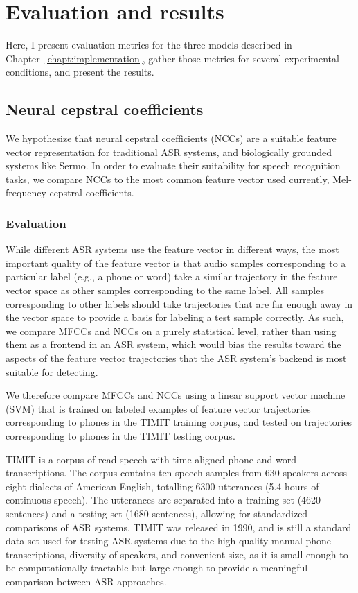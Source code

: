 \chapter{Evaluation and results}
\label{chapt:results}

Here,
I present evaluation metrics for the three models
described in Chapter~\ref{chapt:implementation},
gather those metrics
for several experimental conditions,
and present the results.

\section{Neural cepstral coefficients}

We hypothesize that
neural cepstral coefficients (NCCs)
are a suitable feature vector representation
for traditional ASR systems,
and biologically grounded systems like Sermo.
In order to evaluate
their suitability for speech recognition tasks,
we compare NCCs to the most common
feature vector used currently,
Mel-frequency cepstral coefficients.

\subsection{Evaluation}

While different ASR systems
use the feature vector in different ways,
the most important quality of the feature vector
is that audio samples corresponding
to a particular label
(e.g., a phone or word)
take a similar trajectory
in the feature vector space
as other samples corresponding to the same label.
All samples corresponding to other labels
should take trajectories that are
far enough away in the vector space
to provide a basis for labeling
a test sample correctly.
As such, we compare MFCCs and NCCs
on a purely statistical level,
rather than using them as a frontend
in an ASR system,
which would bias the results
toward the aspects of the
feature vector trajectories
that the ASR system's backend
is most suitable for detecting.

We therefore compare MFCCs and NCCs
using a linear support vector machine (SVM)
that is trained on labeled
examples of feature vector trajectories
corresponding to phones
in the TIMIT training corpus,
and tested on trajectories
corresponding to phones
in the TIMIT testing corpus.

TIMIT \citep{garofolo1993} is a corpus of read speech
with time-aligned phone and word transcriptions.
The corpus contains ten speech samples
from 630 speakers across eight dialects
of American English,
totalling 6300 utterances
(5.4 hours of continuous speech).
The utterances are separated into
a training set
(4620 sentences) and a testing set (1680 sentences),
allowing for standardized
comparisons of ASR systems.
TIMIT was released in 1990,
and is still a standard data set used
for testing ASR systems
due to the high quality
manual phone transcriptions,
diversity of speakers,
and convenient size,
as it is small enough to be
computationally tractable
but large enough to
provide a meaningful comparison
between ASR approaches.

